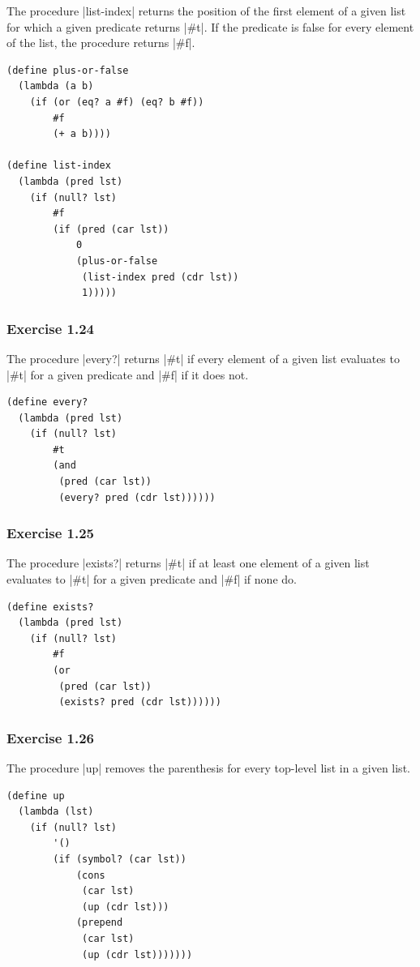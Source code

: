 \documentclass[a4paper]{article}
\begin{document}
The procedure |list-index| returns the position of the first element of a given list for which a given predicate returns |#t|. If the predicate is false for every element of the list, the procedure returns |#f|.

\begin{lstlisting}
(define plus-or-false
  (lambda (a b)
    (if (or (eq? a #f) (eq? b #f))
        #f
        (+ a b))))

(define list-index
  (lambda (pred lst)
    (if (null? lst)
        #f
        (if (pred (car lst))
            0
            (plus-or-false
             (list-index pred (cdr lst))
             1)))))
\end{lstlisting}

\subsubsection{Exercise 1.24}

The procedure |every?| returns |#t| if every element of a given list evaluates to |#t| for a given predicate and |#f| if it does not.

\begin{lstlisting}
(define every?
  (lambda (pred lst)
    (if (null? lst)
        #t
        (and
         (pred (car lst))
         (every? pred (cdr lst))))))
\end{lstlisting}

\subsubsection{Exercise 1.25}

The procedure |exists?| returns |#t| if at least one element of a given list evaluates to |#t| for a given predicate and |#f| if none do.

\begin{lstlisting}
(define exists?
  (lambda (pred lst)
    (if (null? lst)
        #f
        (or
         (pred (car lst))
         (exists? pred (cdr lst))))))
\end{lstlisting}

\subsubsection{Exercise 1.26}

The procedure |up| removes the parenthesis for every top-level list in a given list.

\begin{lstlisting}
(define up
  (lambda (lst)
    (if (null? lst)
        '()
        (if (symbol? (car lst))
            (cons
             (car lst)
             (up (cdr lst)))
            (prepend
             (car lst)
             (up (cdr lst)))))))
\end{lstlisting}
\end{document}
